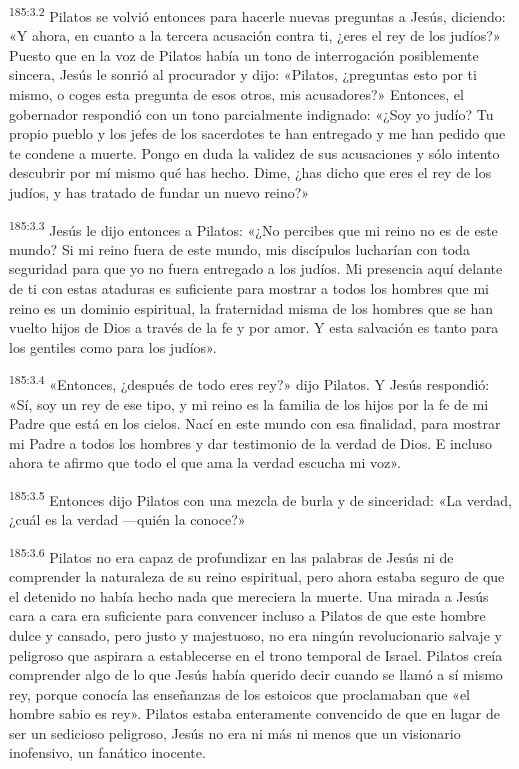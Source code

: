 \par 
\textsuperscript{185:3.2} Pilatos se volvió entonces para hacerle nuevas preguntas a Jesús, diciendo: «Y ahora, en cuanto a la tercera acusación contra ti, ¿eres el rey de los judíos?» Puesto que en la voz de Pilatos había un tono de interrogación posiblemente sincera, Jesús le sonrió al procurador y dijo: «Pilatos, ¿preguntas esto por ti mismo, o coges esta pregunta de esos otros, mis acusadores?» Entonces, el gobernador respondió con un tono parcialmente indignado: «¿Soy yo judío? Tu propio pueblo y los jefes de los sacerdotes te han entregado y me han pedido que te condene a muerte. Pongo en duda la validez de sus acusaciones y sólo intento descubrir por mí mismo qué has hecho. Dime, ¿has dicho que eres el rey de los judíos, y has tratado de fundar un nuevo reino?»

\par 
\textsuperscript{185:3.3} Jesús le dijo entonces a Pilatos: «¿No percibes que mi reino no es de este mundo? Si mi reino fuera de este mundo, mis discípulos lucharían con toda seguridad para que yo no fuera entregado a los judíos. Mi presencia aquí delante de ti con estas ataduras es suficiente para mostrar a todos los hombres que mi reino es un dominio espiritual, la fraternidad misma de los hombres que se han vuelto hijos de Dios a través de la fe y por amor. Y esta salvación es tanto para los gentiles como para los judíos».

\par 
\textsuperscript{185:3.4} «Entonces, ¿después de todo eres rey?» dijo Pilatos. Y Jesús respondió: «Sí, soy un rey de ese tipo, y mi reino es la familia de los hijos por la fe de mi Padre que está en los cielos. Nací en este mundo con esa finalidad, para mostrar mi Padre a todos los hombres y dar testimonio de la verdad de Dios. E incluso ahora te afirmo que todo el que ama la verdad escucha mi voz».

\par 
\textsuperscript{185:3.5} Entonces dijo Pilatos con una mezcla de burla y de sinceridad: «La verdad, ¿cuál es la verdad ---quién la conoce?»

\par 
\textsuperscript{185:3.6} Pilatos no era capaz de profundizar en las palabras de Jesús ni de comprender la naturaleza de su reino espiritual, pero ahora estaba seguro de que el detenido no había hecho nada que mereciera la muerte. Una mirada a Jesús cara a cara era suficiente para convencer incluso a Pilatos de que este hombre dulce y cansado, pero justo y majestuoso, no era ningún revolucionario salvaje y peligroso que aspirara a establecerse en el trono temporal de Israel. Pilatos creía comprender algo de lo que Jesús había querido decir cuando se llamó a sí mismo rey, porque conocía las enseñanzas de los estoicos que proclamaban que «el hombre sabio es rey». Pilatos estaba enteramente convencido de que en lugar de ser un sedicioso peligroso, Jesús no era ni más ni menos que un visionario inofensivo, un fanático inocente.

